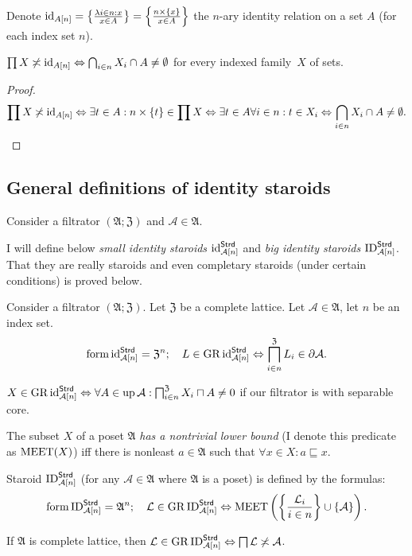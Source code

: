 Denote $\operatorname{id}_{A[n]}=\left\{ \frac{\lambda i\in n:x}{x\in A}\right\}=\left\{ \frac{n\times\{x\}}{x\in A}\right\}$
the $n$-ary identity relation on a set $A$ (for each index set $n$).
\begin{prop}
$\prod X\not\asymp\operatorname{id}_{A[n]}\Leftrightarrow\bigcap_{i\in n}X_{i}\cap A\neq\emptyset$
for every indexed family~$X$ of sets.\end{prop}
\begin{proof}
~
\[
\prod X\not\asymp\operatorname{id}_{A[n]}\Leftrightarrow\exists t\in A:n\times\{t\}\in\prod X\Leftrightarrow\exists t\in A\forall i\in n:t\in X_{i}\Leftrightarrow\bigcap_{i\in n}X_{i}\cap A\neq\emptyset.
\]

\end{proof}

\subsection{General definitions of identity staroids}

Consider a filtrator $(\mathfrak{A};\mathfrak{Z})$ and $\mathcal{A}\in\mathfrak{A}$.

I will define below \emph{small identity staroids} $\operatorname{id}_{\mathcal{A}[n]}^{\mathsf{Strd}}$
and \emph{big identity staroids} $\operatorname{ID}_{\mathcal{A}[n]}^{\mathsf{Strd}}$.
That they are really staroids and even completary staroids (under
certain conditions) is proved below.
\begin{defn}
Consider a filtrator $(\mathfrak{A};\mathfrak{Z})$.
Let $\mathfrak{Z}$ be a complete lattice. Let $\mathcal{A}\in\mathfrak{A}$,
let $n$ be an index set.
\[
\operatorname{form}\operatorname{id}_{\mathcal{A}[n]}^{\mathsf{Strd}}=\mathfrak{Z}^{n};\quad L\in\operatorname{GR}\operatorname{id}_{\mathcal{A}[n]}^{\mathsf{Strd}}\Leftrightarrow\bigsqcap_{i\in n}^{\mathfrak{Z}}L_{i}\in\partial\mathcal{A}.
\]
\end{defn}
\begin{obvious}
$X\in\operatorname{GR}\operatorname{id}_{\mathcal{A}[n]}^{\mathsf{Strd}}\Leftrightarrow\forall A\in\operatorname{up}\mathcal{A}:\bigsqcap_{i\in n}^{\mathfrak{Z}}X_{i}\sqcap A\neq0$
if our filtrator is with separable core.\end{obvious}
\begin{defn}
The subset $X$ of a poset $\mathfrak{A}$
\emph{has a nontrivial lower bound} (I denote this predicate as $\operatorname{MEET}(X)$)
iff there is nonleast $a\in\mathfrak{A}$ such that $\forall x\in X:a\sqsubseteq x$.
\end{defn}

\begin{defn}
Staroid $\operatorname{ID}_{\mathcal{A}[n]}^{\mathsf{Strd}}$ (for any $\mathcal{A}\in\mathfrak{A}$
where $\mathfrak{A}$ is a poset) is defined by the formulas:
\[
\operatorname{form}\operatorname{ID}_{\mathcal{A}[n]}^{\mathsf{Strd}}=\mathfrak{A}^{n};\quad\mathcal{L}\in\operatorname{GR}\operatorname{ID}_{\mathcal{A}[n]}^{\mathsf{Strd}}\Leftrightarrow\operatorname{MEET}\left(\left\{ \frac{\mathcal{L}_{i}}{i\in n}\right\}\cup\{\mathcal{A}\}\right).
\]
\end{defn}
\begin{obvious}
If $\mathfrak{A}$ is complete lattice,
then $\mathcal{L}\in\operatorname{GR}\operatorname{ID}_{\mathcal{A}[n]}^{\mathsf{Strd}}\Leftrightarrow\bigsqcap\mathcal{L}\not\asymp\mathcal{A}$.
\end{obvious}

